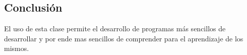 \documentclass[letterpaper, 12pt]{article}
\begin{document}
\begin{justify}
            \section{Conclusión}
            El uso de esta clase permite el desarrollo de programas más sencillos de desarrollar y por ende mas sencillos de comprender para el aprendizaje de los mismos.
        \end{justify}

    \newpage
    \lhead{}
    \printbibliography
\end{document}
